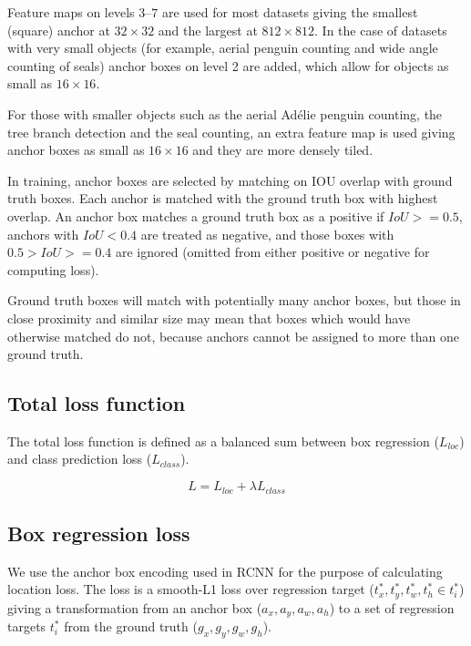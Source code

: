 Feature maps on levels $3$--$7$ are used for most datasets giving the smallest (square) anchor at $32\times32$ and the largest at $812\times812$. In the case of datasets with very small objects (for example, aerial penguin counting and wide angle counting of seals) anchor boxes on level 2 are added, which allow for objects as small as $16 \times 16$.

For those with smaller objects such as the aerial Ad\'elie penguin counting, the tree branch detection and the seal counting, an extra feature map is used giving anchor boxes as small as $16\times16$ and they are more densely tiled.

In training, anchor boxes are selected by matching on \gls{IOU} overlap with ground truth boxes. Each anchor is matched with the ground truth box with highest overlap. An anchor box matches a ground truth box as a positive if $ IoU >= 0.5 $, anchors with $ IoU < 0.4 $ are treated as negative, and those boxes with $ 0.5 > IoU >= 0.4 $ are ignored (omitted from either positive or negative for computing loss).

Ground truth boxes will match with potentially many anchor boxes, but those in close proximity and similar size may mean that boxes which would have otherwise matched do not, because anchors cannot be assigned to more than one ground truth.

\subsection{Total loss function}

The total loss function is defined as a balanced sum between box regression ($L_{loc}$) and class prediction loss ($L_{class}$). 

\begin{equation}
L  = L_{loc} + \lambda L_{class}
\label{eq:loss_total}
\end{equation}

\subsection {Box regression loss}
\label{sec:regression}


We use the anchor box encoding used in \gls{RCNN} \cite{Wang2017} for the purpose of calculating location loss. The loss is a smooth-L1 loss over regression target ($t^*_x, t^*_y, t^*_w, t^*_h \in t^*_i$) giving a transformation from an anchor box ($a_x, a_y, a_w, a_h$)  to a set of regression targets $t^*_i$ from the ground truth ($g_x, g_y, g_w, g_h$). 

